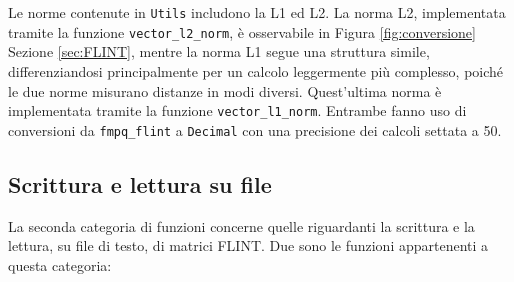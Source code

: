 Le norme contenute in \texttt{Utils} includono la L1 ed L2. La norma 
L2, implementata tramite la funzione \texttt{vector\_l2\_norm}, è osservabile 
in Figura \ref{fig:conversione} Sezione \ref{sec:FLINT}, 
mentre la norma L1 segue una struttura simile, differenziandosi principalmente per un 
calcolo leggermente più complesso, poiché le due norme misurano distanze in modi diversi.
Quest'ultima norma è implementata tramite la funzione \texttt{vector\_l1\_norm}. 
Entrambe fanno uso di conversioni da \texttt{fmpq\_flint} a \texttt{Decimal} con una 
precisione dei calcoli settata a 50. 

\subsection{Scrittura e lettura su file}

La seconda categoria di funzioni concerne quelle riguardanti la scrittura e la lettura,
su file di testo, di matrici FLINT.
Due sono le funzioni appartenenti a questa categoria:

